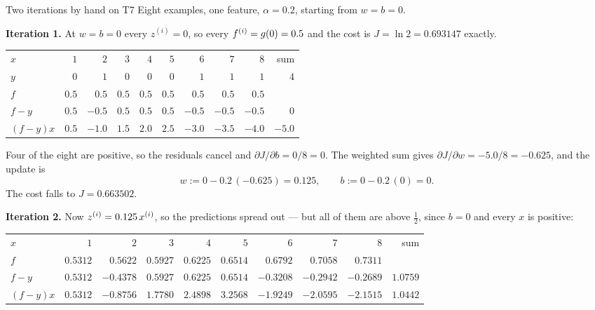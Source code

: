 \begin{workedexample}{Two iterations by hand on T7}
Eight examples, one feature, $\alpha = 0.2$, starting from $w = b = 0$.

\textbf{Iteration 1.} At $w = b = 0$ every $z^{(i)} = 0$, so every
$f^{(i)} = g(0) = 0.5$ and the cost is $J = \ln 2 = 0.693147$ exactly.

\begin{center}
\small
\renewcommand{\arraystretch}{1.15}
\begin{tabular}{@{}l*{8}{r}r@{}}
\toprule
$x$        & $1$ & $2$ & $3$ & $4$ & $5$ & $6$ & $7$ & $8$ & sum\\
$y$        & $0$ & $1$ & $0$ & $0$ & $0$ & $1$ & $1$ & $1$ & $4$\\
$f$        & $0.5$ & $0.5$ & $0.5$ & $0.5$ & $0.5$ & $0.5$ & $0.5$ & $0.5$ & \\
$f-y$      & $0.5$ & $-0.5$ & $0.5$ & $0.5$ & $0.5$ & $-0.5$ & $-0.5$ & $-0.5$ & $0$\\
$(f-y)x$   & $0.5$ & $-1.0$ & $1.5$ & $2.0$ & $2.5$ & $-3.0$ & $-3.5$ & $-4.0$ & $-5.0$\\
\bottomrule
\end{tabular}
\end{center}

Four of the eight are positive, so the residuals cancel and
$\partial J/\partial b = 0/8 = 0$. The weighted sum gives
$\partial J/\partial w = -5.0/8 = -0.625$, and the update is
\[
  w := 0 - 0.2\,(-0.625) = 0.125, \qquad b := 0 - 0.2\,(0) = 0 .
\]
The cost falls to $J = 0.663502$.

\textbf{Iteration 2.} Now $z^{(i)} = 0.125\,x^{(i)}$, so the predictions spread
out --- but all of them are above $\tfrac12$, since $b = 0$ and every $x$ is
positive:

\begin{center}
\footnotesize
\setlength{\tabcolsep}{3pt}
\renewcommand{\arraystretch}{1.15}
\begin{tabular}{@{}l*{8}{r}r@{}}
\toprule
$x$      & $1$ & $2$ & $3$ & $4$ & $5$ & $6$ & $7$ & $8$ & sum\\
$f$      & $0.5312$ & $0.5622$ & $0.5927$ & $0.6225$ & $0.6514$ & $0.6792$
         & $0.7058$ & $0.7311$ & \\
$f-y$    & $0.5312$ & $-0.4378$ & $0.5927$ & $0.6225$ & $0.6514$ & $-0.3208$
         & $-0.2942$ & $-0.2689$ & $1.0759$\\
$(f-y)x$ & $0.5312$ & $-0.8756$ & $1.7780$ & $2.4898$ & $3.2568$ & $-1.9249$
         & $-2.0595$ & $-2.1515$ & $1.0442$\\
\bottomrule
\end{tabular}
\end{center}


\end{workedexample}
